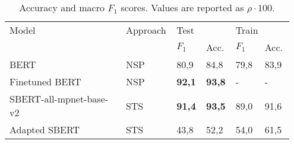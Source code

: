 \squeezeup
\begin{table}
    \centering
    \caption{Accuracy and macro $F_1$ scores. Values are reported as $\rho \cdot 100$.}
    \begin{tabular}{|p{0.4\linewidth}|p{0.15\linewidth}|p{0.1\linewidth}|p{0.1\linewidth}|p{0.1\linewidth}|p{0.1\linewidth}|}
    \hline
        Model & Approach& \multicolumn{2}{l|}{Test} & \multicolumn{2}{l|}{Train}\\ \cline{3-6}
         & & $F_1$ & Acc. & $F_1$ & Acc. \\ \hline
        BERT~\cite{devlin2019bert} & NSP& 80,9 & 84,8 & 79,8 & 83,9 \\ \hline
        Finetuned BERT & NSP& \textbf{92,1} & \textbf{93,8} & - & - \\ \hline
        SBERT-all-mpnet-base-v2~\cite{reimers2019sentence}
        &STS& \textbf{91,4} & \textbf{93,5} & 89,0 & 91,6 \\ \hline
        Adapted SBERT~\cite{steinfeldt2024evaluation}%
        &STS& 43,8 & 52,2 & 54,0 & 61,5 \\ \hline
    \end{tabular}
    \label{tab:all_scores}
\end{table}





